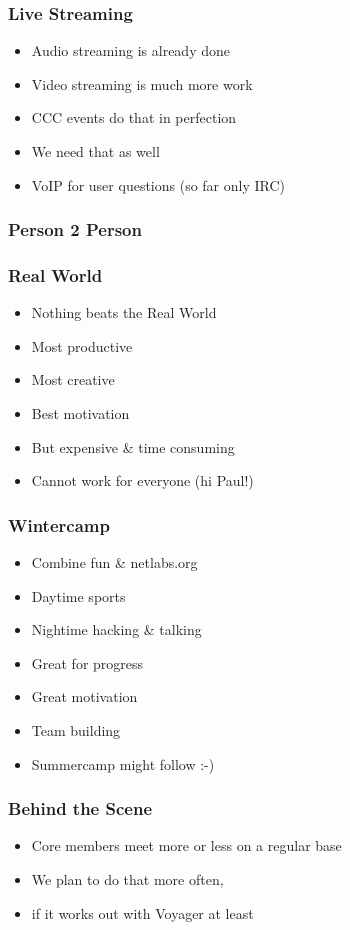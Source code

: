 \documentclass{beamer}
\begin{document}
\begin{frame}
\frametitle{Live Streaming}
\begin{itemize}
  \item Audio streaming is already done
  \item Video streaming is much more work
  \item CCC events do that in perfection
  \item We need that as well
  \item VoIP for user questions (so far only IRC)
\end{itemize}
\end{frame}

\subsubsection{Person 2 Person}

\begin{frame}
\frametitle{Real World}
\begin{itemize}
  \item Nothing beats the Real World\texttrademark
  \item Most productive
  \item Most creative
  \item Best motivation
  \item But expensive \& time consuming
  \item Cannot work for everyone (hi Paul!)
\end{itemize}
\end{frame}

\begin{frame}
\frametitle{Wintercamp}
\begin{itemize}
  \item Combine fun \& netlabs.org
  \item Daytime sports
  \item Nightime hacking \& talking
  \item Great for progress
  \item Great motivation
  \item Team building
  \item Summercamp might follow :-)
\end{itemize}
\end{frame}

\begin{frame}
\frametitle{Behind the Scene}
\begin{itemize}
  \item Core members meet more or less on a regular base
  \item We plan to do that more often,
  \item if it works out with Voyager at least 
\end{itemize}
\end{frame}
\end{document}
